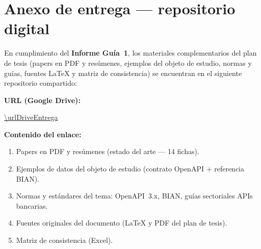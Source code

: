 \cleardoublepage
\chapter*{Anexo de entrega — repositorio digital}
\thispagestyle{empty}

\noindent
En cumplimiento del \textbf{Informe Guía~1}, los materiales complementarios del plan de tesis
(papers en PDF y resúmenes, ejemplos del objeto de estudio, normas y guías, fuentes LaTeX y matriz
de consistencia) se encuentran en el siguiente repositorio compartido:

\vspace{0.8cm}
\noindent\textbf{URL (Google Drive):}\par
\vspace{0.3cm}
\noindent\url{\urlDriveEntrega}

\vspace{0.8cm}
\noindent\textbf{Contenido del enlace:}
\begin{enumerate}
  \item Papers en PDF y resúmenes (estado del arte — 14 fichas).
  \item Ejemplos de datos del objeto de estudio (contrato OpenAPI + referencia BIAN).
  \item Normas y estándares del tema: OpenAPI~3.x, BIAN, guías sectoriales APIs bancarias.
  \item Fuentes originales del documento (LaTeX y PDF del plan de tesis).
  \item Matriz de consistencia (Excel).
\end{enumerate}
